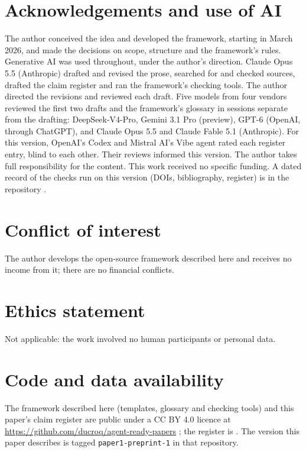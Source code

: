 \documentclass[12pt, a4paper]{article}
\begin{document}
\section*{Acknowledgements and use of AI}

The author conceived the idea and developed the framework, starting in
March 2026, and made the decisions on scope, structure and the
framework's rules.  Generative AI was used throughout, under the author's direction.  Claude Opus 5.5 (Anthropic)
drafted and revised the prose, searched for and checked sources,
drafted the claim register and ran the framework's checking tools.  The author directed the revisions and reviewed each draft.  Five models
from four vendors reviewed the first two drafts and the framework's
glossary in sessions separate from the drafting: DeepSeek-V4-Pro,
Gemini 3.1 Pro (preview), GPT-6 (OpenAI, through ChatGPT), and Claude
Opus 5.5 and Claude Fable 5.1 (Anthropic).  For this version, OpenAI's Codex and Mistral AI's Vibe agent rated each register entry, blind to each other.  Their reviews informed this version.  The author takes full responsibility for the content.
This work received no specific funding.
A dated record of the checks run on this version (DOIs, bibliography, register) is in the repository \citep{veen2026repo}.


\section*{Conflict of interest}

The author develops the open-source framework described here and
receives no income from it; there are no financial conflicts.

\section*{Ethics statement}

Not applicable: the work involved no human participants or personal data.

\section*{Code and data availability}

The framework described here (templates, glossary and checking tools)
and this paper's claim register are public under a CC BY 4.0 licence at
\url{https://github.com/ducroq/agent-ready-papers} \citep{veen2026repo};
the register is .
The version this paper describes is tagged
\texttt{paper1-preprint-1} in that repository.
\end{document}

